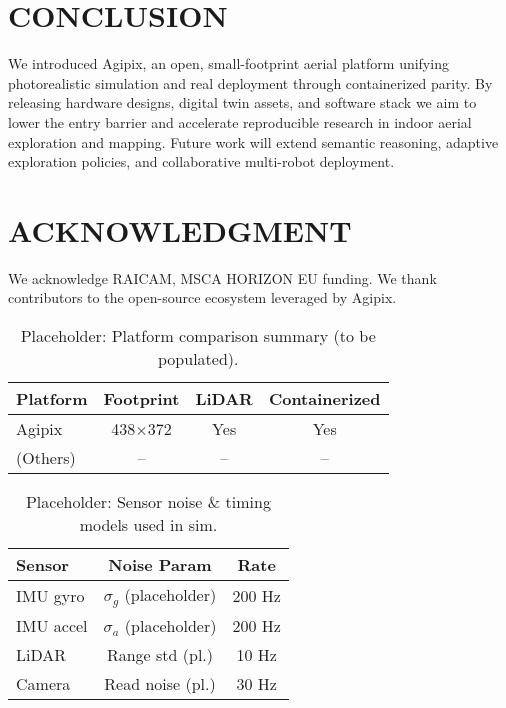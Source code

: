 \documentclass[letterpaper, 10 pt, conference]{ieeeconf}  %
\begin{document}
\section{CONCLUSION}
We introduced Agipix, an open, small-footprint aerial platform unifying photorealistic simulation and real deployment through containerized parity. By releasing hardware designs, digital twin assets, and software stack we aim to lower the entry barrier and accelerate reproducible research in indoor aerial exploration and mapping. Future work will extend semantic reasoning, adaptive exploration policies, and collaborative multi-robot deployment.

\section*{ACKNOWLEDGMENT}
We acknowledge RAICAM, MSCA HORIZON EU funding. We thank contributors to the open-source ecosystem leveraged by Agipix.

\begin{table}[t]
        \centering
        \caption{Placeholder: Platform comparison summary (to be populated).}
        \label{tab:comparison_placeholder}
        \begin{tabular}{lccc}
                \hline
                Platform & Footprint & LiDAR & Containerized \\
                \hline
                Agipix & 438\(\times\)372 & Yes & Yes \\
                (Others) & -- & -- & -- \\
                \hline
        \end{tabular}
\end{table}

\begin{table}[t]
        \centering
        \caption{Placeholder: Sensor noise \& timing models used in sim.}
        \label{tab:noise_models}
        \begin{tabular}{lcc}
                \hline
                Sensor & Noise Param & Rate \\
                \hline
                IMU gyro & $\sigma_g$ (placeholder) & 200 Hz \\
                IMU accel & $\sigma_a$ (placeholder) & 200 Hz \\
                LiDAR & Range std (pl.) & 10 Hz \\
                Camera & Read noise (pl.) & 30 Hz \\
                \hline
        \end{tabular}
\end{table}
\end{document}
